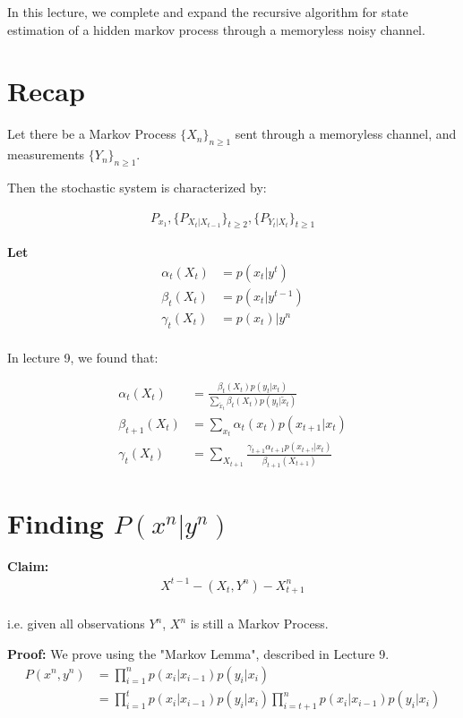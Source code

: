 \documentclass{article}
\begin{document}
In this lecture, we complete and expand the recursive algorithm for state estimation of a hidden markov process through a memoryless noisy channel. 




\section{Recap}

Let there be a Markov Process $\{X_n\}_{n \geq 1}$ sent through a memoryless channel, and measurements $\{Y_n\}_{n \geq 1}$.

Then the stochastic system is characterized by:

\begin{align*}
P_{x_1}, \{P_{X_t | X_{t-1}}\}_{t \geq 2}, \{P_{Y_t | X_t}\}_{t \geq 1}
\end{align*}

\textbf{Let}
\begin{align*}
\alpha_t(X_t) &= p(x_t | y^t)\\
\beta_t(X_t) &= p(x_t | y^{t-1})\\
\gamma_t(X_t) &= p(x_t) | y^n\\
\end{align*}

In lecture 9, we found that:

\begin{align*}
\alpha_t(X_t) &= \frac{\beta_t(X_t)p(y_t | x_t)}{\sum_{\tilde{x}_t}^{}\beta_t(X_t)p(y_t | \tilde{x}_t)}\\
\beta_{t+1}(X_t) &= \sum_{x_t}^{}\alpha_t(x_t)p(x_{t+1} | x_t)\\
\gamma_t(X_t) &= \sum_{X_{t+1}}^{}\frac{\gamma_{t+1}\alpha_{t+1}p(x_{t+!} | x_t)}{\beta_{t+1}(X_{t+1})}
\end{align*}

\section{Finding $ P(x^n | y^n) $}
\textbf{Claim:} 
\begin{align*}
X^{t-1} - (X_t, Y^n) - X^{n}_{t+1}\\
\end{align*}

i.e. given all observations $Y^n$, $X^n$ is still a Markov Process.

\textbf{Proof:}  We prove using the "Markov Lemma", described in Lecture 9.
\begin{align*}
P(x^n,y^n) &= \prod_{i=1}^{n}p(x_i | x_{i-1})p(y_i | x_i)\\
&= \prod_{i=1}^{t}p(x_i | x_{i-1})p(y_i | x_i) \prod_{i = t+1}^{n}p(x_i | x_{i-1})p(y_i | x_i)\\
\end{align*}
\end{document}
